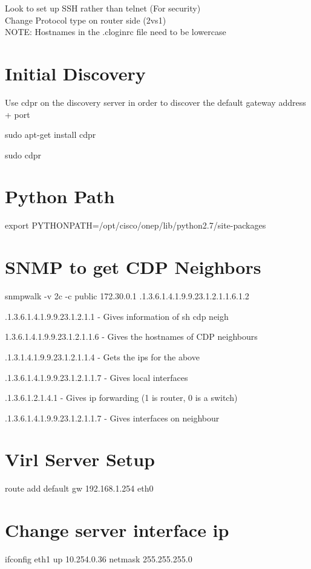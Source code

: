 \documentclass[11pt]{report}
\begin{document}
Look to set up SSH rather than telnet (For security)
\\
Change Protocol type on router side (2vs1)
\\
NOTE: Hostnames in the .cloginrc file need to be lowercase

\section*{Initial Discovery}

Use cdpr on the discovery server in order to discover the default gateway address + port

sudo apt-get install cdpr

sudo cdpr

\section*{Python Path}

 export PYTHONPATH=/opt/cisco/onep/lib/python2.7/site-packages
 
\section*{SNMP to get CDP Neighbors}

snmpwalk -v 2c -c public 172.30.0.1 .1.3.6.1.4.1.9.9.23.1.2.1.1.6.1.2

.1.3.6.1.4.1.9.9.23.1.2.1.1 - Gives information of sh cdp neigh

1.3.6.1.4.1.9.9.23.1.2.1.1.6  - Gives the hostnames of CDP neighbours 

.1.3.1.4.1.9.9.23.1.2.1.1.4 - Gets the ips for the above

.1.3.6.1.4.1.9.9.23.1.2.1.1.7 - Gives local interfaces

.1.3.6.1.2.1.4.1 - Gives ip forwarding (1 is router, 0 is a switch)

.1.3.6.1.4.1.9.9.23.1.2.1.1.7 - Gives interfaces on neighbour

\section{Virl Server Setup}
route add default gw 192.168.1.254 eth0

\section{Change server interface ip}
ifconfig eth1 up 10.254.0.36 netmask 255.255.255.0



\end{document}
